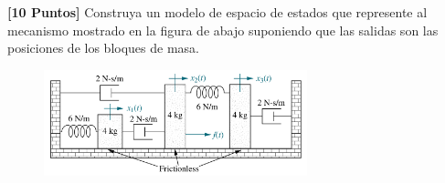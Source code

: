 \documentclass[ a4paper, twoside, 11pt]{article}
\begin{document}
\begin{problem} \textbf{[10 Puntos]} Construya un modelo de espacio de estados que represente al mecanismo mostrado en la figura de abajo suponiendo que las salidas son las posiciones de los bloques de masa. 

\begin{figure}[htb]
\centering
\includegraphics[width=0.68\textwidth]{prob_espacio-estados.jpg}
\end{figure}


\end{problem}
\end{document}
